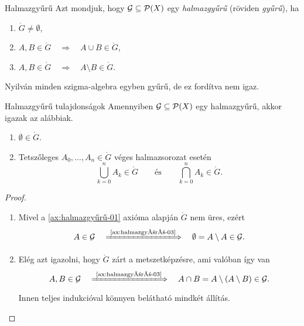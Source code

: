 \documentclass[
]{elteikthesis}[2024/04/26]
\begin{document}
	\begin{definition}{Halmazgyűrű}{}
		Azt mondjuk, hogy \( \mathcal{G} \subseteq \mathcal{P}( X ) \) egy \emph{halmazgyűrű} 
		(röviden \emph{gyűrű}), ha
		\begin{enumerate}[label={(\( \ring{G} \)\arabic*)}, ref={\( \ring{G} \)\arabic*.}]
			\item\label{ax:halmazgyűrű-01}
			\( \ring{G} \neq \emptyset \),
			
			\item\label{ax:halmazgyűrű-02}
			\( A, B \in \ring{G} \quad \Longrightarrow \quad A \cup B \in \ring{G} \),
			
			\item\label{ax:halmazgyűrű-03}
			\( A, B \in \ring{G} \quad \Longrightarrow \quad A \setminus B \in \ring{G} \).
		\end{enumerate}
	\end{definition}
	
	\begin{note}
		Nyilván minden szigma-algebra egyben gyűrű, de ez fordítva nem igaz.
	\end{note}
	
	\begin{statement}{Halmazgyűrű tulajdonságok}{}
		Amennyiben \( \mathcal{G} \subseteq \mathcal{P}( X ) \) egy halmazgyűrű, akkor igazak az alábbiak.
		\begin{enumerate}[label={(\( \ring{G} \)\arabic*)}, ref={\( \ring{G} \)\arabic*.}, start=4]
			\item\label{eq:halmazgyűrű-04}
			\( \emptyset \in \ring{G} \).
			
			\item\label{eq:halmazgyűrű-05}
			Tetszőleges \( A_0, \dots, A_n \in \ring{G} \) véges halmazsorozat esetén
			\[
				\bigcup_{k=0}^{n} A_k \in \ring{G} \qquad \text{és} \qquad
				\bigcap_{k=0}^{n} A_k \in \ring{G}.
			\]
		\end{enumerate}
	\end{statement}
	\begin{proof}\,
		\begin{enumerate}
			\item Mivel a \ref{ax:halmazgyűrű-01} axióma alapján \( \ring{G} \) nem üres, ezért
			\[
				A \in \ring{G}
				\quad \xLongrightarrow{\ \text{\ref{ax:halmazgyűrű-03}} } \quad
				\emptyset = A \setminus A \in \ring{G}.
			\]
			
			\item Elég azt igazolni, hogy \( \ring{G} \) zárt a metszetképzésre, ami valóban így van
			\[
				A, B \in \ring{G}
				\quad \xLongrightarrow{\ \text{\ref{ax:halmazgyűrű-03}} } \quad
				A \cap B = A \setminus (A \setminus B) \in \ring{G}.
			\]
			Innen teljes indukcióval könnyen belátható mindkét állítás.
		\end{enumerate}
	\end{proof}
	
\end{document}
